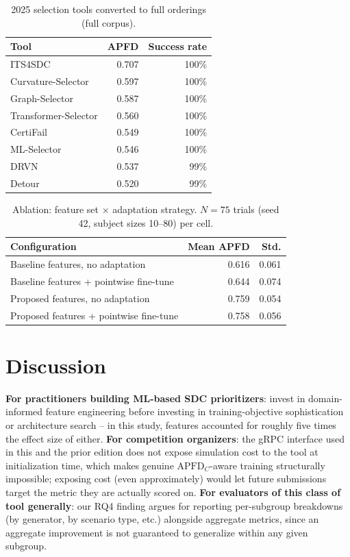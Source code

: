 \documentclass[smallextended]{svjour3}
\begin{document}
\begin{table}[t]
\caption{2025 selection tools converted to full orderings (full corpus).}
\label{tab:crossedition}
\begin{tabular}{lrr}
\toprule
Tool & APFD & Success rate \\
\midrule
ITS4SDC & 0.707 & 100\% \\
Curvature-Selector & 0.597 & 100\% \\
Graph-Selector & 0.587 & 100\% \\
Transformer-Selector & 0.560 & 100\% \\
CertiFail & 0.549 & 100\% \\
ML-Selector & 0.546 & 100\% \\
DRVN & 0.537 & 99\% \\
Detour & 0.520 & 99\% \\
\bottomrule
\end{tabular}
\end{table}

\begin{table}[t]
\caption{Ablation: feature set $\times$ adaptation strategy. $N=75$ trials
(seed 42, subject sizes 10--80) per cell.}
\label{tab:ablation}
\begin{tabular}{lrr}
\toprule
Configuration & Mean APFD & Std. \\
\midrule
Baseline features, no adaptation & 0.616 & 0.061 \\
Baseline features + pointwise fine-tune & 0.644 & 0.074 \\
Proposed features, no adaptation & 0.759 & 0.054 \\
Proposed features + pointwise fine-tune & 0.758 & 0.056 \\
\bottomrule
\end{tabular}
\end{table}

\section{Discussion}
\label{sec:discussion}
\textbf{For practitioners building ML-based SDC prioritizers}: invest in
domain-informed feature engineering before investing in training-objective
sophistication or architecture search -- in this study, features accounted
for roughly five times the effect size of either. \textbf{For competition
organizers}: the gRPC interface used in this and the prior edition does not
expose simulation cost to the tool at initialization time, which makes
genuine $\mathrm{APFD}_C$-aware training structurally impossible; exposing
cost (even approximately) would let future submissions target the metric
they are actually scored on. \textbf{For evaluators of this class of tool
generally}: our RQ4 finding argues for reporting per-subgroup breakdowns
(by generator, by scenario type, etc.) alongside aggregate metrics, since
an aggregate improvement is not guaranteed to generalize within any given
subgroup.
\end{document}
